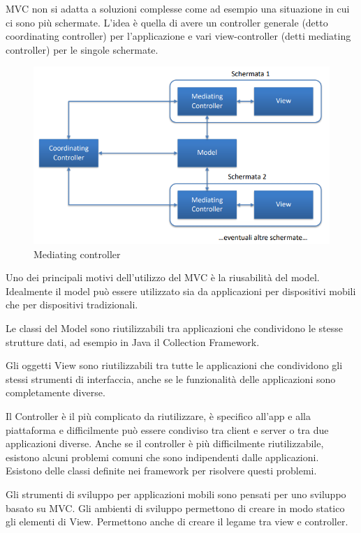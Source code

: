 MVC non si adatta a soluzioni complesse come ad esempio una situazione in cui ci sono più schermate. 
L'idea è quella di avere un controller generale (detto coordinating controller) per l'applicazione e vari view-controller (detti mediating controller) per le singole schermate. 

\begin{figure}[!ht]
    \centering
    \includegraphics[width=.8\textwidth]{images/Mobile computing/6. Progettazione/mediating controller.PNG}
    \caption{Mediating controller}
    \label{fig:mediating controller}
\end{figure}

Uno dei principali motivi dell'utilizzo del MVC è la riusabilità del model. Idealmente il model può essere utilizzato sia da applicazioni per dispositivi mobili che per dispositivi tradizionali. 

Le classi del Model sono riutilizzabili tra applicazioni che condividono le stesse strutture dati, ad esempio in Java il Collection Framework. 

Gli oggetti View sono riutilizzabili tra tutte le applicazioni che 
condividono gli stessi strumenti di interfaccia, anche se le funzionalità delle applicazioni sono completamente diverse.

Il Controller è il più complicato da riutilizzare, è specifico all'app e alla piattaforma e difficilmente può essere condiviso tra client e server o tra due applicazioni diverse.
Anche se il controller è più difficilmente riutilizzabile, esistono alcuni problemi comuni che sono indipendenti dalle applicazioni.
Esistono delle classi definite nei framework per risolvere questi problemi.

Gli strumenti di sviluppo per applicazioni mobili sono pensati per uno sviluppo basato su MVC.
Gli ambienti di sviluppo permettono di creare in modo statico gli elementi di View. 
Permettono anche di creare il legame tra view e controller. 
